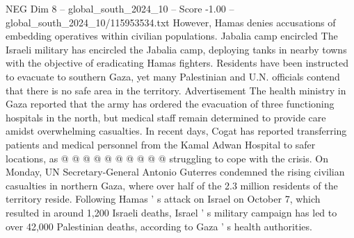 \begin{textsample}{NEG Dim 8 – global\_south\_2024\_10 – Score -1.00 – global\_south\_2024\_10/115953534.txt}
However, Hamas denies accusations of embedding operatives within civilian populations.
Jabalia camp encircled The Israeli military has encircled the Jabalia camp, deploying tanks in nearby towns with the objective of eradicating Hamas fighters.
Residents have been instructed to evacuate to southern Gaza, yet many Palestinian and U.N. officials contend that there is no safe area in the territory.
Advertisement The health ministry in Gaza reported that the army has ordered the evacuation of three functioning hospitals in the north, but medical staff remain determined to provide care amidst overwhelming casualties.
In recent days, Cogat has reported transferring patients and medical personnel from the Kamal Adwan Hospital to safer locations, as @ @ @ @ @ @ @ @ @ @ struggling to cope with the crisis.
On Monday, UN Secretary-General Antonio Guterres condemned the rising civilian casualties in northern Gaza, where over half of the 2.3 million residents of the territory reside.
Following Hamas ' s attack on Israel on October 7, which resulted in around 1,200 Israeli deaths, Israel ' s military campaign has led to over 42,000 Palestinian deaths, according to Gaza ' s health authorities.

\end{textsample}
